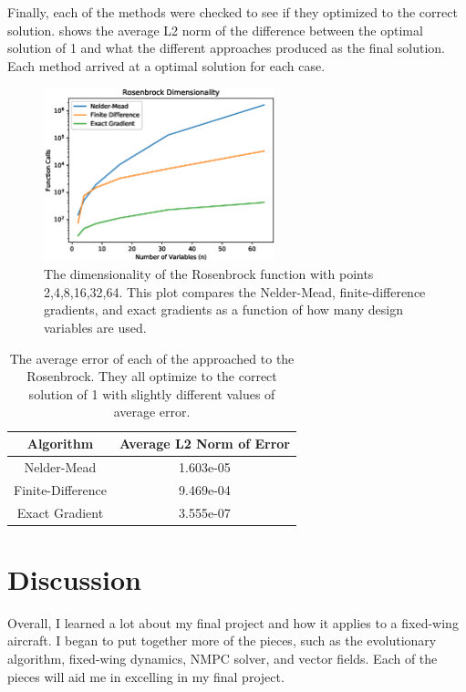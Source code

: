 \documentclass{article}
\begin{document}
Finally, each of the methods were checked to see if they optimized to the correct solution.  shows the average L2 norm of the difference between the optimal solution of 1 and what the different approaches produced as the final solution. Each method arrived at a optimal solution for each case.


\begin{figure}[htbp]
	\centering
	\includegraphics[width=0.6\textwidth]{figures/dimensionality.eps}
	\caption{The dimensionality of the Rosenbrock function with points 2,4,8,16,32,64. This plot compares the Nelder-Mead, finite-difference gradients, and exact gradients as a function of how many design variables are used.}
	\label{fig:dimensionality}
\end{figure}

\begin{table}[htb]
	\centering
	\caption{The average error of each of the approached to the Rosenbrock. They all optimize to the correct solution of 1 with slightly different values of average error. }
	\label{tab:dimensionality}
	\begin{tabular}{c|c}
		\toprule
		Algorithm & Average L2 Norm of Error \\
		\midrule
		Nelder-Mead & 1.603e-05 \\
		Finite-Difference & 9.469e-04 \\
		Exact Gradient & 3.555e-07 \\
		\bottomrule
	\end{tabular}
\end{table}

\section*{Discussion}

Overall, I learned a lot about my final project and how it applies to a fixed-wing aircraft. I began to put together more of the pieces, such as the evolutionary algorithm, fixed-wing dynamics, NMPC solver, and vector fields. Each of the pieces will aid me in excelling in my final project.
\end{document}
